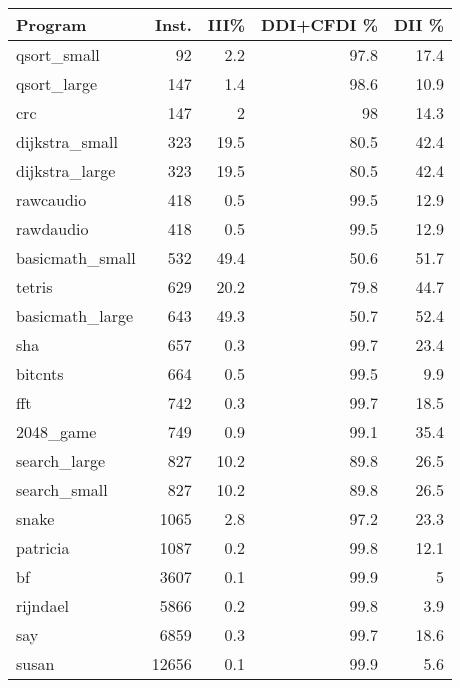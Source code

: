 \begin{tabular}{|l|r|r|r|r|}
\hline
 Program         &   Inst. &   III\% &   DDI+CFDI \% &   DII \% \\
\hline
 qsort\_small     &      92 &    2.2 &         97.8 &    17.4 \\
\hline
 qsort\_large     &     147 &    1.4 &         98.6 &    10.9 \\
\hline
 crc             &     147 &    2   &         98   &    14.3 \\
\hline
 dijkstra\_small  &     323 &   19.5 &         80.5 &    42.4 \\
\hline
 dijkstra\_large  &     323 &   19.5 &         80.5 &    42.4 \\
\hline
 rawcaudio       &     418 &    0.5 &         99.5 &    12.9 \\
\hline
 rawdaudio       &     418 &    0.5 &         99.5 &    12.9 \\
\hline
 basicmath\_small &     532 &   49.4 &         50.6 &    51.7 \\
\hline
 tetris          &     629 &   20.2 &         79.8 &    44.7 \\
\hline
 basicmath\_large &     643 &   49.3 &         50.7 &    52.4 \\
\hline
 sha             &     657 &    0.3 &         99.7 &    23.4 \\
\hline
 bitcnts         &     664 &    0.5 &         99.5 &     9.9 \\
\hline
 fft             &     742 &    0.3 &         99.7 &    18.5 \\
\hline
 2048\_game       &     749 &    0.9 &         99.1 &    35.4 \\
\hline
 search\_large    &     827 &   10.2 &         89.8 &    26.5 \\
\hline
 search\_small    &     827 &   10.2 &         89.8 &    26.5 \\
\hline
 snake           &    1065 &    2.8 &         97.2 &    23.3 \\
\hline
 patricia        &    1087 &    0.2 &         99.8 &    12.1 \\
\hline
 bf              &    3607 &    0.1 &         99.9 &     5   \\
\hline
 rijndael        &    5866 &    0.2 &         99.8 &     3.9 \\
\hline
 say             &    6859 &    0.3 &         99.7 &    18.6 \\
\hline
 susan           &   12656 &    0.1 &         99.9 &     5.6 \\

\end{tabular}
